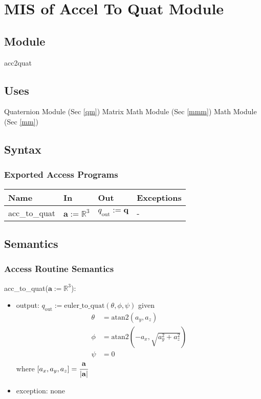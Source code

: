 \documentclass[12pt, titlepage]{article}
\begin{document}
\section{MIS of Accel To Quat Module} \label{iqewomm}

\subsection{Module}
acc2quat

\subsection{Uses}
Quaternion Module (Sec \ref{qm})\newline
Matrix Math Module (Sec \ref{mmm}) \newline
Math Module (Sec \ref{mm})

\subsection{Syntax}

\subsubsection{Exported Access Programs}

\begin{center}
\begin{tabular}{p{2cm} p{4cm} p{4cm} p{2cm}}
\hline
\textbf{Name} & \textbf{In} & \textbf{Out} & \textbf{Exceptions} \\
\hline
acc\_to\_quat & $\mathbf{a}:=\mathbb{R}^3$ & $q_\text{out} := \mathbf{q}$ & - \\
\hline
\end{tabular}
\end{center}

\subsection{Semantics}

\subsubsection{Access Routine Semantics}

\noindent acc\_to\_quat($\mathbf{a}:=\mathbb{R}^3$):
\begin{itemize}
\item output: $q_\text{out}:= \text{euler\_to\_quat}(\theta, \phi, \psi)$ given
\begin{align*}
  \theta &= \text{atan2}(a_y, a_z) \\
  \phi &= \text{atan2}(-a_x, \sqrt{a_y^2+a_z^2}) \\
  \psi &= 0
\end{align*}
where $[a_x, a_y, a_z] = \cfrac{\mathbf{a}}{|\mathbf{a}|}$
\item exception: none
\end{itemize}
\end{document}
